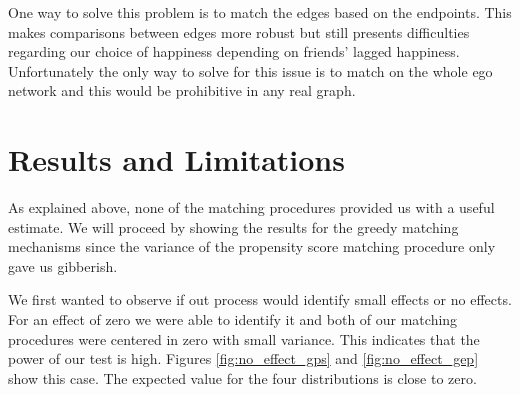 \documentclass[11pt]{article}
\begin{document}
One way to solve this problem is to match the edges based on the endpoints. This makes comparisons between edges more robust but still presents difficulties regarding our choice of happiness depending on friends' lagged happiness. Unfortunately the only way to solve for this issue is to match on the whole ego network and this would be prohibitive in any real graph.


\section{Results and Limitations}
\label{Results}



As explained above, none of the matching procedures provided us with a useful estimate. We will proceed by showing the results for the greedy matching mechanisms since the variance of the propensity score matching procedure only gave us gibberish.

We first wanted to observe if out process would identify small effects or no effects. For an effect of zero we were able to identify it and both of our matching procedures were centered in zero with small variance. This indicates that the power of our test is high. Figures \ref{fig:no_effect_gps} and \ref{fig:no_effect_gep} show this case. The expected value for the four distributions is close to zero.
\end{document}
